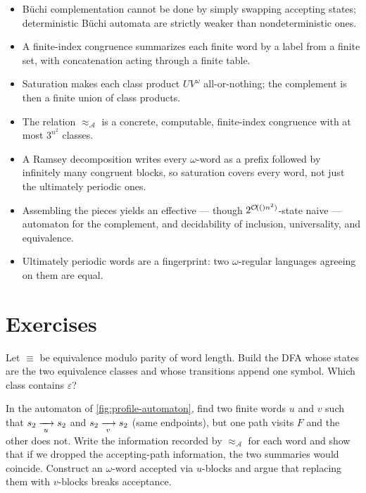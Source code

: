 \begin{summarybox}
\begin{itemize}[nosep]
  \item B\"uchi complementation cannot be done by simply swapping accepting
        states; deterministic B\"uchi automata are strictly weaker than
        nondeterministic ones.
  \item A finite-index congruence summarizes each finite word by a label
        from a finite set, with concatenation acting through a finite
        table.
  \item Saturation makes each class product $UV^\omega$ all-or-nothing;
        the complement is then a finite union of class products.
  \item The relation $\approx_{\mathcal A}$ is a concrete,
        computable, finite-index congruence with at most $3^{n^2}$ classes.
  \item A Ramsey decomposition writes every $\omega$-word as a prefix
        followed by infinitely many congruent blocks, so saturation
        covers every word, not just the ultimately periodic ones.
  \item Assembling the pieces yields an effective --- though
        $2^{\mathcal{O}\!\left((\right)n^2)}$-state naive --- automaton for the complement, and
        decidability of inclusion, universality, and equivalence.
  \item Ultimately periodic words are a fingerprint: two $\omega$-regular
        languages agreeing on them are equal.
\end{itemize}
\end{summarybox}

\section*{Exercises}

\begin{chapex}
Let $\equiv$ be equivalence modulo parity of word length.  Build the DFA
whose states are the two equivalence classes and whose transitions append
one symbol.  Which class contains $\varepsilon$?
\end{chapex}

\begin{chapex}
In the automaton of \cref{fig:profile-automaton}, find two finite words
$u$ and $v$ such that $s_2\xrightarrow[{\;u\;}]{}s_2$ and
$s_2\xrightarrow[{\;v\;}]{}s_2$ (same endpoints), but one path visits $F$ and
the other does not.  Write the information recorded by
$\approx_{\mathcal A}$ for each word and show
that if we dropped the accepting-path information, the two summaries would
coincide.  Construct an $\omega$-word accepted via $u$-blocks and argue
that replacing them with $v$-blocks breaks acceptance.
\end{chapex}

